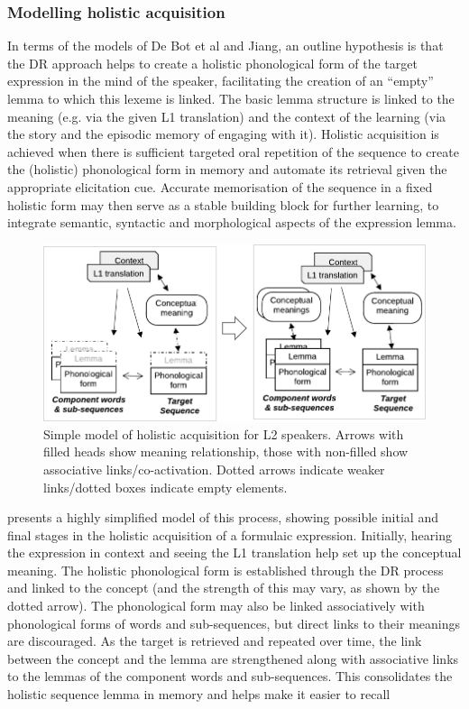 \documentclass[output=paper]{langscibook}
\begin{document}
\subsubsection{Modelling holistic acquisition}
In terms of the models of De Bot et al and Jiang, an outline hypothesis is that the DR approach helps to create a holistic phonological form of the target expression in the mind of the speaker, facilitating the creation of an ``empty'' lemma to which this lexeme is linked. The basic lemma structure is linked to the meaning (e.g. via the given L1 translation) and the context of the learning (via the story and the episodic memory of engaging with it). Holistic acquisition is achieved when there is sufficient targeted oral repetition of the sequence to create the (holistic) phonological form in memory and automate its retrieval given the appropriate elicitation cue. Accurate memorisation of the sequence in a fixed holistic form may then serve as a stable building block for further learning, to integrate semantic, syntactic and morphological aspects of the expression lemma. 

\begin{figure}
\caption{Simple model of holistic acquisition for L2 speakers. Arrows with filled heads show meaning relationship, those with non-filled show associative links\slash co-activation. Dotted arrows indicate weaker links\slash dotted boxes indicate empty elements.\label{fig:cutler:4}}
\includegraphics[width=\textwidth]{figures/cutlerFig4.pdf}
\end{figure}

 presents a highly simplified model of this process, showing possible initial and final stages in the holistic acquisition of a formulaic expression. Initially, hearing the expression in context and seeing the L1 translation help set up the conceptual meaning. The holistic phonological form is established through the DR process and linked to the concept (and the strength of this may vary, as shown by the dotted arrow). The phonological form may also be linked associatively with phonological forms of words and sub-sequences, but direct links to their meanings are discouraged. As the target is retrieved and repeated over time, the link between the concept and the lemma are strengthened along with associative links to the lemmas of the component words and sub-sequences. This consolidates the holistic sequence lemma in memory and helps make it easier to recall
\end{document}

